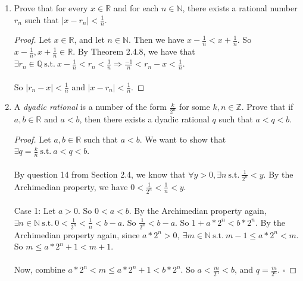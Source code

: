 \documentclass[12pt,letterpaper]{article}
\theoremstyle{case}
\begin{document}
\begin{enumerate}
\begin{enumerate}
\begin{proof}
			\begin{enumerate}
				\item $\inf S \notin S\ \text{but}\ \inf S \in J$, and
				\item $\sup S \notin S\ \text{but}\ \sup S \in J$
			\end{enumerate}
			Thus since $\inf S, \sup S \in J, I_s \subseteq J$, since $\inf S, \sup S \in I_s$. Also, if $S = I_s$, then clearly $I_s \subseteq J$.
		\end{proof}
	\end{enumerate}
	\item Prove that for every $x \in \mathbb{R}$ and for each $n \in \mathbb{N}$, there exists a rational number $r_n$ such that $|x-r_n| < \frac{1}{n}$.
	\begin{proof}
		Let $x \in \mathbb{R}$, and let $n \in \mathbb{N}$. Then we have $x - \frac{1}{n} < x + \frac{1}{n}$. So $x-\frac{1}{n}, x+\frac{1}{n} \in \mathbb{R}$. By Theorem 2.4.8, we have that $\exists r_n \in \mathbb{Q}\ \text{s.t.}\ x-\frac{1}{n} < r_n < \frac{1}{n} \Rightarrow \frac{-1}{n} < r_n - x < \frac{1}{n}$.
		\\\\ So $|r_n -x| < \frac{1}{n}$ and $|x - r_n| < \frac{1}{n}$.
	\end{proof}
	\item A \textit{dyadic rational} is a number of the form $\frac{k}{2^n}$ for some $k,n \in \mathbb{Z}$. Prove that if $a,b \in \mathbb{R}$ and $a < b$, then there exists a dyadic rational $q$ such that $a < q < b$.
	\begin{proof}
		Let $a,b \in \mathbb{R}$ such that $a < b$. We want to show that $\exists q = \frac{k}{n}\ \text{s.t.}\ a < q < b$.
		\\\\By question 14 from Section 2.4, we know that $\forall y > 0, \exists n\ \text{s.t.}\ \frac{1}{2^n} < y$. By the Archimedian property, we have $0 < \frac{1}{2^n} < \frac{1}{n} < y$.
		\\\\
			Case 1: Let $a > 0$. So $0 < a < b$. By the Archimedian property again, $\exists n \in \mathbb{N}\ \text{s.t.}\ 0 < \frac{1}{2^n} < \frac{1}{n} < b-a$. So $\frac{1}{2^n} < b-a$. So $1+a*2^n < b*2^n$. By the Archimedian property again, since $a*2^n > 0,\ \exists m \in \mathbb{N}\ \text{s.t.}\ m-1 \leq a*2^n < m$. So $m \leq a*2^n+1 < m+1$.
			\\\\Now, combine $a*2^n < m \leq a*2^n+1 < b*2^n$. So $a < \frac{m}{2^n} < b$, and $q=\frac{m}{2^n}$. $\square$

\end{proof}
\end{enumerate}
\end{document}
